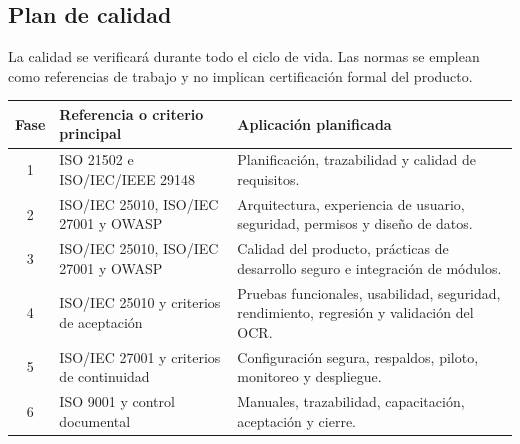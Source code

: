 \documentclass[12pt,a4paper]{article}
\begin{document}
\subsection{Plan de calidad}

La calidad se verificará durante todo el ciclo de vida. Las normas se emplean como referencias de trabajo y no implican certificación formal del producto.

\begin{center}
\renewcommand{\arraystretch}{1.15}
\begin{tabularx}{\textwidth}{|c|X|X|}
\hline
\rowcolor{tableheader}
\textbf{Fase} & \textbf{Referencia o criterio principal} & \textbf{Aplicación planificada} \\ \hline
1 & ISO 21502 e ISO/IEC/IEEE 29148 & Planificación, trazabilidad y calidad de requisitos. \\ \hline
2 & ISO/IEC 25010, ISO/IEC 27001 y OWASP & Arquitectura, experiencia de usuario, seguridad, permisos y diseño de datos. \\ \hline
3 & ISO/IEC 25010, ISO/IEC 27001 y OWASP & Calidad del producto, prácticas de desarrollo seguro e integración de módulos. \\ \hline
4 & ISO/IEC 25010 y criterios de aceptación & Pruebas funcionales, usabilidad, seguridad, rendimiento, regresión y validación del OCR. \\ \hline
5 & ISO/IEC 27001 y criterios de continuidad & Configuración segura, respaldos, piloto, monitoreo y despliegue. \\ \hline
6 & ISO 9001 y control documental & Manuales, trazabilidad, capacitación, aceptación y cierre. \\ \hline
\end{tabularx}
\end{center}
\end{document}
